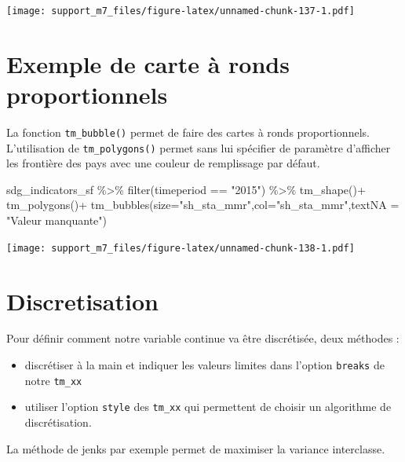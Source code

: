 \documentclass[
]{book}
\newenvironment{Shaded}{\begin{snugshade}}{\end{snugshade}}
\newcommand{\AttributeTok}[1]{\textcolor[rgb]{0.77,0.63,0.00}{#1}}
\newcommand{\FunctionTok}[1]{\textcolor[rgb]{0.00,0.00,0.00}{#1}}
\newcommand{\NormalTok}[1]{#1}
\newcommand{\SpecialCharTok}[1]{\textcolor[rgb]{0.00,0.00,0.00}{#1}}
\newcommand{\StringTok}[1]{\textcolor[rgb]{0.31,0.60,0.02}{#1}}
\begin{document}
\texttt{[image: support\_m7\_files/figure-latex/unnamed-chunk-137-1.pdf]}

\hypertarget{exemple-de-carte-uxe0-ronds-proportionnels}{%
\section{Exemple de carte à ronds proportionnels}\label{exemple-de-carte-uxe0-ronds-proportionnels}}

La fonction \texttt{tm\_bubble()} permet de faire des cartes à ronds proportionnels. L'utilisation de \texttt{tm\_polygons()} permet sans lui spécifier de paramètre d'afficher les frontière des pays avec une couleur de remplissage par défaut.

\begin{Shaded}
\begin{Highlighting}[]
\NormalTok{sdg\_indicators\_sf }\SpecialCharTok{\%\textgreater{}\%} 
  \FunctionTok{filter}\NormalTok{(timeperiod }\SpecialCharTok{==} \StringTok{"2015"}\NormalTok{) }\SpecialCharTok{\%\textgreater{}\%} 
  \FunctionTok{tm\_shape}\NormalTok{()}\SpecialCharTok{+}
  \FunctionTok{tm\_polygons}\NormalTok{()}\SpecialCharTok{+}
  \FunctionTok{tm\_bubbles}\NormalTok{(}\AttributeTok{size=}\StringTok{"sh\_sta\_mmr"}\NormalTok{,}\AttributeTok{col=}\StringTok{"sh\_sta\_mmr"}\NormalTok{,}\AttributeTok{textNA =} \StringTok{"Valeur manquante"}\NormalTok{)}
\end{Highlighting}
\end{Shaded}

\texttt{[image: support\_m7\_files/figure-latex/unnamed-chunk-138-1.pdf]}

\hypertarget{discretisation}{%
\section{Discretisation}\label{discretisation}}

Pour définir comment notre variable continue va être discrétisée, deux méthodes :

\begin{itemize}
\item
  discrétiser à la main et indiquer les valeurs limites dans l'option \texttt{breaks} de notre \texttt{tm\_xx}
\item
  utiliser l'option \texttt{style} des \texttt{tm\_xx} qui permettent de choisir un algorithme de discrétisation.
\end{itemize}

La méthode de jenks par exemple permet de maximiser la variance interclasse.
\end{document}
